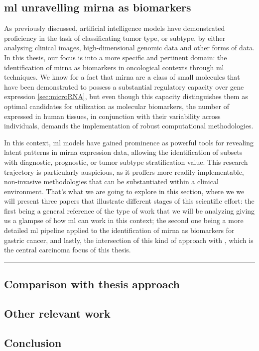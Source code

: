 \subsection{\gls{ml} unravelling \gls{mirna} as biomarkers}

As previously discussed, artificial intelligence models have demonstrated
proficiency in the task of classificating tumor type, or subtype, by either
analysing clinical images, high-dimensional genomic data and other forms of
data. In this thesis, our focus is into a more specific and pertinent domain:
the identification of \gls{mirna} as biomarkers in oncological contexts through
\gls{ml} techniques. We know for a fact that \gls{mirna} are a class of small
molecules that have been demonstrated to possess a substantial regulatory
capacity over gene expression \ref{sec:microRNA}, but even though this capacity
distinguishes them as optimal candidates for utilization as molecular
biomarkers, the number of  expressed in human tissues, in
conjunction with their variability across individuals, demands the
implementation of robust computational methodologies.

In this context, \gls{ml} models have gained prominence as powerful tools for
revealing latent patterns in \gls{mirna} expression data, allowing the
identification of subsets with diagnostic, prognostic, or tumor subtype
stratification value. This research trajectory is particularly auspicious, as
it proffers more readily implementable, non-invasive methodologies that can be
substantiated within a clinical environment. That's what we are going to
explore in this section, where we we will present three papers that illustrate
different stages of this scientific effort: the first being a general reference
of the type of work that we will be analyzing giving us a glampse of how
\gls{ml} can work in this context; the second one being a more detailed
\gls{ml} pipeline applied to the identification of \gls{mirna} as biomarkers
for gastric cancer, and lastly, the intersection of this kind of approach with
, which is the central carcinoma focus of this thesis.

\noindent\rule{\linewidth}{0.4pt}



\subsection{Comparison with thesis approach}

\subsection{Other relevant work}

\subsection{Conclusion}